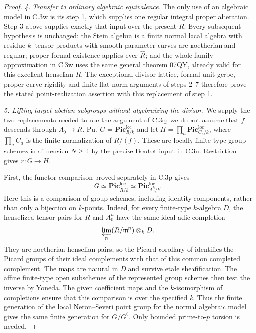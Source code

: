 \begin{proof}
\emph{4. Transfer to ordinary algebraic equivalence.}
The only use of an algebraic model in C.3w is its
step 1, which supplies one regular integral proper
alteration. Step 3 above supplies exactly that input
over the present $R$. Every subsequent hypothesis
is unchanged: the Stein algebra is a finite normal
local algebra with residue $k$; tensor products with
smooth parameter curves are noetherian and regular;
proper formal existence applies over $\widehat R$;
and the whole-family approximation in C.3w uses the
same general theorem 07QY, already valid for this
excellent henselian $R$.
The exceptional-divisor lattice, formal-unit gerbe,
proper-curve rigidity and finite-flat norm arguments
of steps 2--7 therefore prove the stated
point-realization assertion with this replacement of step 1.

\emph{5. Lifting target abelian subgroups without algebraizing the divisor.}
We supply the two replacements needed to use the argument of C.3q;
we do not assume that $f$ descends through $A_0\to R$.
Put $G=\mathbf{Pic}^{\mathrm{loc}}_{R/k}$ and let
$H=\prod_a\mathbf{Pic}^{\mathrm{loc}}_{C_a/k}$, where
$\prod_a C_a$ is the finite normalization of $R/(f)$.
These are locally finite-type group schemes in dimension $N\ge4$
by the precise Boutot input in C.3n. Restriction gives $r:G\to H$.

First, the functor comparison proved separately in C.3p gives
\[
 G\simeq\mathbf{Pic}^{\mathrm{loc}}_{\widehat R/k}
   \simeq\mathbf{Pic}^{\mathrm{loc}}_{A_0^h/k}.
\]
Here this is a comparison of group schemes, including identity
components, rather than only a bijection on $k$-points.
Indeed, for every finite-type $k$-algebra $D$, the henselized
tensor pairs for $R$ and $A_0^h$ have the same ideal-adic completion
\[
             \varprojlim_n(R/\mathfrak m^n)\otimes_k D.
\]
They are noetherian henselian pairs, so the Picard corollary of
\citet[Section III, p.~573]{D_Elkik1973} identifies the Picard
groups of their ideal complements with that of this common
completed complement. The maps are natural in $D$ and survive
etale sheafification. The affine finite-type open subschemes
of the represented group schemes then test the inverse by
Yoneda. The given coefficient maps and the $k$-isomorphism of
completions ensure that this comparison is over the specified $k$.
Thus the finite generation of the local Neron--Severi point
group for the normal algebraic model
\citep[Definition 3.4 and the following paragraph, p.~468]
{D_Kollar2016LocalPicard} gives the same finite generation
for $G/G^0$. Only bounded prime-to-$p$ torsion is needed.


\end{proof}
